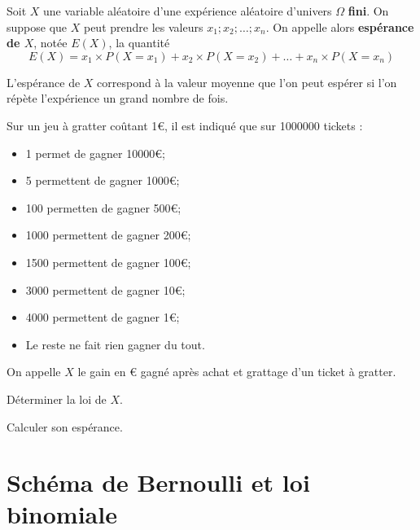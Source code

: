 \documentclass{article}
\begin{document}
\newpage
\begin{tcolorbox}
\begin{definition}
Soit $X$ une variable aléatoire d'une expérience aléatoire d'univers $\Omega$ \textbf{fini}. On suppose que $X$ peut prendre les valeurs $x_1; x_2; \dots; x_n$. On appelle alors \textbf{espérance de $X$}, notée $E(X)$, la quantité
\begin{equation*}
E(X) = x_1 \times P(X=x_1) + x_2 \times P(X = x_2) + \dots + x_n \times P(X = x_n)
\end{equation*} 
\end{definition}
\end{tcolorbox}
\begin{remark}
L'espérance de $X$ correspond à la valeur moyenne que l'on peut espérer si l'on répète l'expérience un grand nombre de fois.
\end{remark}
\begin{example}
Sur un jeu à gratter coûtant \num{1}€, il est indiqué que sur \num{1000000} tickets :
\begin{itemize}
\item \num{1} permet de gagner \num{10000}€; 
\item \num{5} permettent de gagner \num{1000}€; 
\item \num{100} permetten de gagner \num{500}€; 
\item \num{1000} permettent de gagner \num{200}€; 
\item \num{1500} permettent de gagner \num{100}€; 
\item \num{3000} permettent de gagner \num{10}€;
\item \num{4000} permettent de gagner \num{1}€;
\item Le reste ne fait rien gagner du tout.
\end{itemize}
On appelle $X$ le gain en € gagné après achat et grattage d'un ticket à gratter.
\begin{enumquestions}
\item Déterminer la loi de $X$.
\item Calculer son espérance.
\end{enumquestions}
\emptybox{7cm}
\end{example}
\newpage
\section{Schéma de Bernoulli et loi binomiale}
\end{document}
